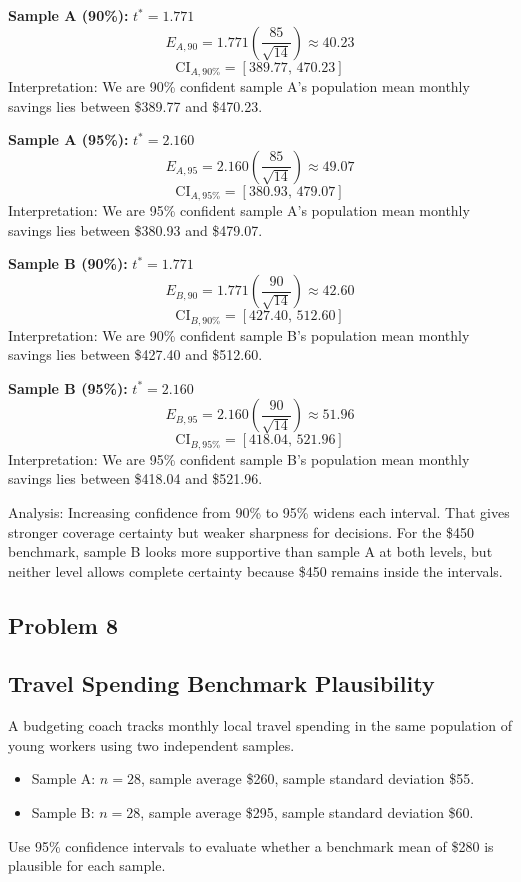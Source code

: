 \textbf{Sample A (90\%):} \(t^*=1.771\)
\[
E_{A,90}=1.771\left(\frac{85}{\sqrt{14}}\right)\approx 40.23
\]
\[
\text{CI}_{A,90\%}=[389.77,\,470.23]
\]
Interpretation: We are 90\% confident sample A's population mean monthly savings lies between \$389.77 and \$470.23.

\textbf{Sample A (95\%):} \(t^*=2.160\)
\[
E_{A,95}=2.160\left(\frac{85}{\sqrt{14}}\right)\approx 49.07
\]
\[
\text{CI}_{A,95\%}=[380.93,\,479.07]
\]
Interpretation: We are 95\% confident sample A's population mean monthly savings lies between \$380.93 and \$479.07.

\textbf{Sample B (90\%):} \(t^*=1.771\)
\[
E_{B,90}=1.771\left(\frac{90}{\sqrt{14}}\right)\approx 42.60
\]
\[
\text{CI}_{B,90\%}=[427.40,\,512.60]
\]
Interpretation: We are 90\% confident sample B's population mean monthly savings lies between \$427.40 and \$512.60.

\textbf{Sample B (95\%):} \(t^*=2.160\)
\[
E_{B,95}=2.160\left(\frac{90}{\sqrt{14}}\right)\approx 51.96
\]
\[
\text{CI}_{B,95\%}=[418.04,\,521.96]
\]
Interpretation: We are 95\% confident sample B's population mean monthly savings lies between \$418.04 and \$521.96.

Analysis: Increasing confidence from 90\% to 95\% widens each interval. That gives stronger coverage certainty but weaker sharpness for decisions. For the \$450 benchmark, sample B looks more supportive than sample A at both levels, but neither level allows complete certainty because \$450 remains inside the intervals.

\subsection*{Problem 8}
\subsection*{Travel Spending Benchmark Plausibility}
A budgeting coach tracks monthly local travel spending in the same population of young workers using two independent samples.
\begin{itemize}
  \item Sample A: \(n=28\), sample average \$260, sample standard deviation \$55.
  \item Sample B: \(n=28\), sample average \$295, sample standard deviation \$60.
\end{itemize}
Use 95\% confidence intervals to evaluate whether a benchmark mean of \$280 is plausible for each sample.

